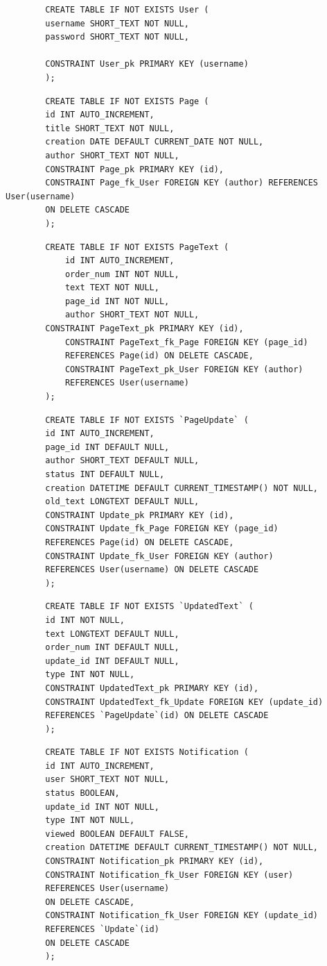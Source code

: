 \documentclass{article}
\begin{document}
	\begin{lstlisting}
		CREATE TABLE IF NOT EXISTS User (
		username SHORT_TEXT NOT NULL,
		password SHORT_TEXT NOT NULL,
		
		CONSTRAINT User_pk PRIMARY KEY (username)
		);
	\end{lstlisting}
		
	\begin{lstlisting}
		CREATE TABLE IF NOT EXISTS Page (
		id INT AUTO_INCREMENT,
		title SHORT_TEXT NOT NULL,
		creation DATE DEFAULT CURRENT_DATE NOT NULL,
		author SHORT_TEXT NOT NULL,
		CONSTRAINT Page_pk PRIMARY KEY (id),
		CONSTRAINT Page_fk_User FOREIGN KEY (author) REFERENCES User(username)
		ON DELETE CASCADE
		);
	\end{lstlisting}
	
	\begin{lstlisting}
		CREATE TABLE IF NOT EXISTS PageText (
			id INT AUTO_INCREMENT,
			order_num INT NOT NULL,
			text TEXT NOT NULL,
			page_id INT NOT NULL,
			author SHORT_TEXT NOT NULL,
	    CONSTRAINT PageText_pk PRIMARY KEY (id),
			CONSTRAINT PageText_fk_Page FOREIGN KEY (page_id) 
			REFERENCES Page(id) ON DELETE CASCADE,
			CONSTRAINT PageText_pk_User FOREIGN KEY (author)
			REFERENCES User(username)
		);
	\end{lstlisting}
	
	
	\begin{lstlisting}
		CREATE TABLE IF NOT EXISTS `PageUpdate` (
		id INT AUTO_INCREMENT,
		page_id INT DEFAULT NULL,
		author SHORT_TEXT DEFAULT NULL,
		status INT DEFAULT NULL,
		creation DATETIME DEFAULT CURRENT_TIMESTAMP() NOT NULL,
		old_text LONGTEXT DEFAULT NULL,
		CONSTRAINT Update_pk PRIMARY KEY (id),
		CONSTRAINT Update_fk_Page FOREIGN KEY (page_id)
		REFERENCES Page(id) ON DELETE CASCADE,
		CONSTRAINT Update_fk_User FOREIGN KEY (author)
		REFERENCES User(username) ON DELETE CASCADE
		);
	\end{lstlisting}
	
	\begin{lstlisting}
		CREATE TABLE IF NOT EXISTS `UpdatedText` (
		id INT NOT NULL,
		text LONGTEXT DEFAULT NULL,
		order_num INT DEFAULT NULL,
		update_id INT DEFAULT NULL,
		type INT NOT NULL,
		CONSTRAINT UpdatedText_pk PRIMARY KEY (id),
		CONSTRAINT UpdatedText_fk_Update FOREIGN KEY (update_id)
		REFERENCES `PageUpdate`(id) ON DELETE CASCADE
		);
	\end{lstlisting}

	\begin{lstlisting}
		CREATE TABLE IF NOT EXISTS Notification (
		id INT AUTO_INCREMENT,
		user SHORT_TEXT NOT NULL,
		status BOOLEAN,
		update_id INT NOT NULL,
		type INT NOT NULL,
		viewed BOOLEAN DEFAULT FALSE,
		creation DATETIME DEFAULT CURRENT_TIMESTAMP() NOT NULL,
		CONSTRAINT Notification_pk PRIMARY KEY (id),
		CONSTRAINT Notification_fk_User FOREIGN KEY (user)
		REFERENCES User(username)
		ON DELETE CASCADE,
		CONSTRAINT Notification_fk_User FOREIGN KEY (update_id) 
		REFERENCES `Update`(id)
		ON DELETE CASCADE
		);
	\end{lstlisting}
	
\end{document}
